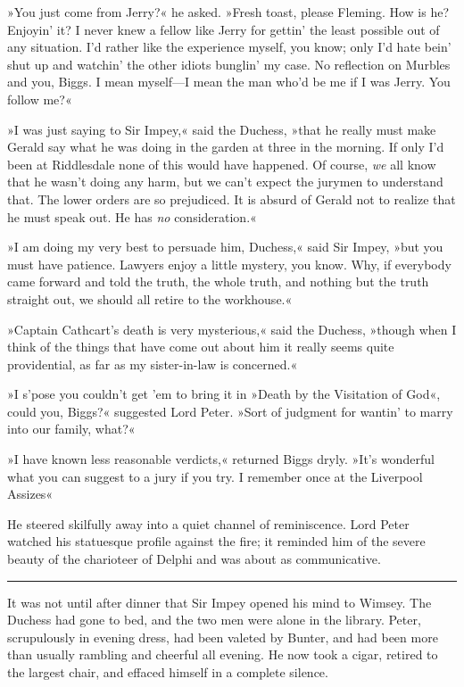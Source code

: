 »You just come from Jerry?« he asked. »Fresh toast, please Fleming. How is he? Enjoyin' it? I never knew a fellow like Jerry for gettin' the least possible out of any situation. I'd rather like the experience myself, you know; only I'd hate bein' shut up and watchin' the other idiots bunglin' my case. No reflection on Murbles and you, Biggs. I mean myself—I mean the man who'd be me if I was Jerry. You follow me?«

»I was just saying to Sir Impey,« said the Duchess, »that he really must make Gerald say what he was doing in the garden at three in the morning. If only I'd been at Riddlesdale none of this would have happened. Of course, \textit{we} all know that he wasn't doing any harm, but we can't expect the jurymen to understand that. The lower orders are so prejudiced. It is absurd of Gerald not to realize that he must speak out. He has \textit{no} consideration.«

»I am doing my very best to persuade him, Duchess,« said Sir Impey, »but you must have patience. Lawyers enjoy a little mystery, you know.  Why, if everybody came forward and told the truth, the whole truth, and nothing but the truth straight out, we should all retire to the workhouse.«

»Captain Cathcart's death is very mysterious,« said the Duchess, »though when I think of the things that have come out about him it really seems quite providential, as far as my sister-in-law is concerned.«

»I s'pose you couldn't get 'em to bring it in »Death by the Visitation of God«, could you, Biggs?« suggested Lord Peter. »Sort of judgment for wantin' to marry into our family, what?«

»I have known less reasonable verdicts,« returned Biggs dryly. »It's wonderful what you can suggest to a jury if you try. I remember once at the Liverpool Assizes\longdash«

He steered skilfully away into a quiet channel of reminiscence. Lord Peter watched his statuesque profile against the fire; it reminded him of the severe beauty of the charioteer of Delphi and was about as communicative.

\noindent\hfil\rule{0.5\textwidth}{.4pt}\hfil

It was not until after dinner that Sir Impey opened his mind to Wimsey.  The Duchess had gone to bed, and the two men were alone in the library.  Peter, scrupulously in evening dress, had been valeted by Bunter, and had been more than usually rambling and cheerful all evening. He now took a cigar, retired to the largest chair, and effaced himself in a complete silence.

